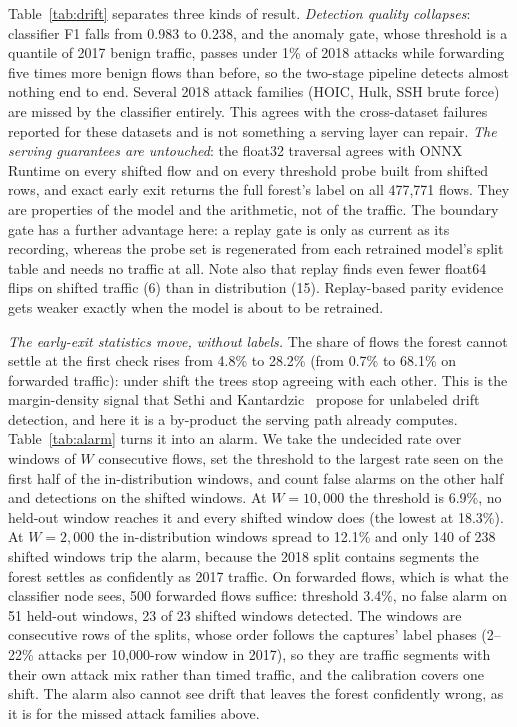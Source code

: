 \documentclass[runningheads]{llncs}
\begin{document}
Table~\ref{tab:drift} separates three kinds of result. \emph{Detection quality collapses}: classifier F1 falls from 0.983 to 0.238, and the anomaly gate, whose threshold is a quantile of 2017 benign traffic, passes under 1\% of 2018 attacks while forwarding five times more benign flows than before, so the two-stage pipeline detects almost nothing end to end. Several 2018 attack families (HOIC, Hulk, SSH brute force) are missed by the classifier entirely. This agrees with the cross-dataset failures reported for these datasets and is not something a serving layer can repair. \emph{The serving guarantees are untouched}: the float32 traversal agrees with ONNX Runtime on every shifted flow and on every threshold probe built from shifted rows, and exact early exit returns the full forest's label on all 477{,}771 flows. They are properties of the model and the arithmetic, not of the traffic. The boundary gate has a further advantage here: a replay gate is only as current as its recording, whereas the probe set is regenerated from each retrained model's split table and needs no traffic at all. Note also that replay finds even fewer float64 flips on shifted traffic (6) than in distribution (15). Replay-based parity evidence gets weaker exactly when the model is about to be retrained.

\emph{The early-exit statistics move, without labels.} The share of flows the forest cannot settle at the first check rises from 4.8\% to 28.2\% (from 0.7\% to 68.1\% on forwarded traffic): under shift the trees stop agreeing with each other. This is the margin-density signal that Sethi and Kantardzic~\cite{sethi2017md3} propose for unlabeled drift detection, and here it is a by-product the serving path already computes. Table~\ref{tab:alarm} turns it into an alarm. We take the undecided rate over windows of $W$ consecutive flows, set the threshold to the largest rate seen on the first half of the in-distribution windows, and count false alarms on the other half and detections on the shifted windows. At $W=10{,}000$ the threshold is 6.9\%, no held-out window reaches it and every shifted window does (the lowest at 18.3\%). At $W=2{,}000$ the in-distribution windows spread to 12.1\% and only 140 of 238 shifted windows trip the alarm, because the 2018 split contains segments the forest settles as confidently as 2017 traffic. On forwarded flows, which is what the classifier node sees, 500 forwarded flows suffice: threshold 3.4\%, no false alarm on 51 held-out windows, 23 of 23 shifted windows detected. The windows are consecutive rows of the splits, whose order follows the captures' label phases (2--22\% attacks per 10{,}000-row window in 2017), so they are traffic segments with their own attack mix rather than timed traffic, and the calibration covers one shift. The alarm also cannot see drift that leaves the forest confidently wrong, as it is for the missed attack families above.
\end{document}
